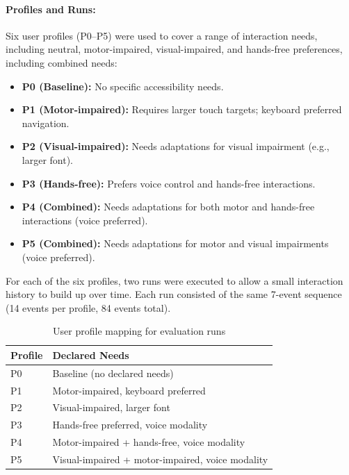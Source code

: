 \documentclass[openany]{book}
\begin{document}
\paragraph{Profiles and Runs:}
Six user profiles (P0--P5) were used to cover a range of interaction needs, including neutral, motor-impaired, visual-impaired, and hands-free preferences, including combined needs:
\begin{itemize}
    \item \textbf{P0 (Baseline):} No specific accessibility needs.
    \item \textbf{P1 (Motor-impaired):} Requires larger touch targets; keyboard preferred navigation.
    \item \textbf{P2 (Visual-impaired):} Needs adaptations for visual impairment (e.g., larger font).
    \item \textbf{P3 (Hands-free):} Prefers voice control and hands-free interactions.
    \item \textbf{P4 (Combined):} Needs adaptations for both motor and hands-free interactions (voice preferred).
    \item \textbf{P5 (Combined):} Needs adaptations for motor and visual impairments (voice preferred).
\end{itemize}
For each of the six profiles, two runs were executed to allow a small interaction history to build up over time. Each run consisted of the same 7-event sequence (14 events per profile, 84 events total). 

\begin{table}[h]
\centering
\caption{User profile mapping for evaluation runs}
\begin{tabular}{ll}
\toprule
\textbf{Profile} & \textbf{Declared Needs} \\
\midrule
P0 & Baseline (no declared needs) \\
P1 & Motor-impaired, keyboard preferred \\
P2 & Visual-impaired, larger font \\
P3 & Hands-free preferred, voice modality \\
P4 & Motor-impaired + hands-free, voice modality \\
P5 & Visual-impaired + motor-impaired, voice modality \\
\bottomrule
\end{tabular}
\end{table}
\end{document}
